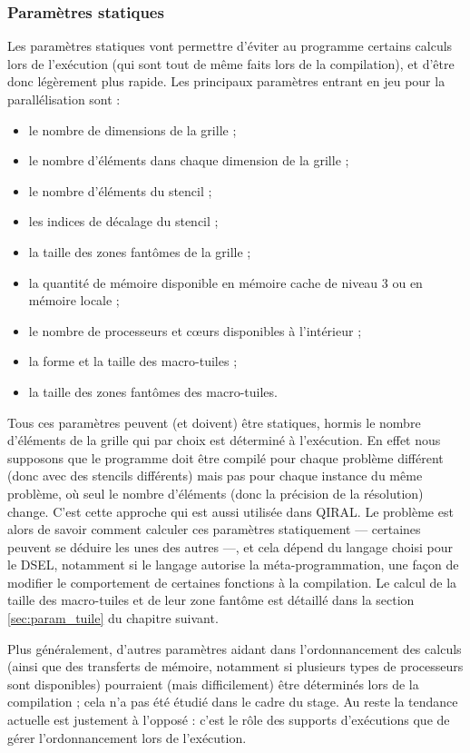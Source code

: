 \subsubsection*{Paramètres statiques}

Les paramètres statiques vont permettre d'éviter au programme certains calculs lors de l'exécution (qui sont tout de même faits lors de la compilation), et d'être donc légèrement plus rapide. Les principaux paramètres entrant en jeu pour la parallélisation sont :
\begin{itemize}
\item le nombre de dimensions de la grille ;
\item le nombre d'éléments dans chaque dimension de la grille ;
\item le nombre d'éléments du stencil ;
\item les indices de décalage du stencil ;
\item la taille des zones fantômes de la grille ;
\item la quantité de mémoire disponible en mémoire cache de niveau 3 ou en mémoire locale ;
\item le nombre de processeurs et cœurs disponibles à l'intérieur ;
\item la forme et la taille des macro-tuiles ;
\item la taille des zones fantômes des macro-tuiles.
\end{itemize}

Tous ces paramètres peuvent (et doivent) être statiques, hormis le nombre d'éléments de la grille qui par choix est déterminé à l'exécution. En effet nous supposons que le programme doit être compilé pour chaque problème différent (donc avec des stencils différents) mais pas pour chaque instance du même problème, où seul le nombre d'éléments (donc la précision de la résolution) change. C'est cette approche qui est aussi utilisée dans \textsf{QIRAL}. Le problème est alors de savoir comment calculer ces paramètres statiquement --- certaines peuvent se déduire les unes des autres ---, et cela dépend du langage choisi pour le DSEL, notamment si le langage autorise la méta-programmation, une façon de modifier le comportement de certaines fonctions à la compilation. Le calcul de la taille des macro-tuiles et de leur zone fantôme est détaillé dans la section \ref{sec:param_tuile} du chapitre suivant.

Plus généralement, d'autres paramètres aidant dans l'ordonnancement des calculs (ainsi que des transferts de mémoire, notamment si plusieurs types de processeurs sont disponibles) pourraient (mais difficilement) être déterminés lors de la compilation ; cela n'a pas été étudié dans le cadre du stage. Au reste la tendance actuelle est justement à l'opposé : c'est le rôle des supports d'exécutions que de gérer l'ordonnancement lors de l'exécution. 


